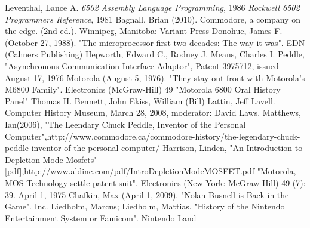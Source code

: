 \documentclass[journal]{IEEEtran}
\begin{document}
\begin{thebibliography}{1}

Leventhal, Lance A. \emph{6502 Assembly Language Programming}, 1986
\emph{Rockwell 6502 Programmers Reference}, 1981
Bagnall, Brian (2010). Commodore, a company on the edge. (2nd ed.). Winnipeg, Manitoba: Variant Press
Donohue, James F. (October 27, 1988). "The microprocessor first two decades: The way it was". EDN (Cahners Publishing) 
Hepworth, Edward C., Rodney J. Means, Charles I. Peddle, "Asynchronous Communication Interface Adaptor", Patent 3975712, issued August 17, 1976
Motorola (August 5, 1976). "They stay out front with Motorola's M6800 Family". Electronics (McGraw-Hill) 49
"Motorola 6800 Oral History Panel" Thomas H. Bennett, John Ekiss, William (Bill) Lattin, Jeff Lavell. Computer History Museum, March 28, 2008, moderator: David Laws.
Matthews, Ian(2006), "The Leendary Chuck Peddle, Inventor of the Personal Computer",http://www.commodore.ca/commodore-history/the-legendary-chuck-peddle-inventor-of-the-personal-computer/
Harrison, Linden, "An Introduction to Depletion-Mode Mosfets"[pdf],http://www.aldinc.com/pdf/IntroDepletionModeMOSFET.pdf
"Motorola, MOS Technology settle patent suit". Electronics (New York: McGraw-Hill) 49 (7): 39. April 1, 1975
Chafkin, Max (April 1, 2009). "Nolan Busnell is Back in the Game". Inc.
Liedholm, Marcus; Liedholm, Mattias. "History of the Nintendo Entertainment System or Famicom". Nintendo Land

\end{thebibliography}
\end{document}
